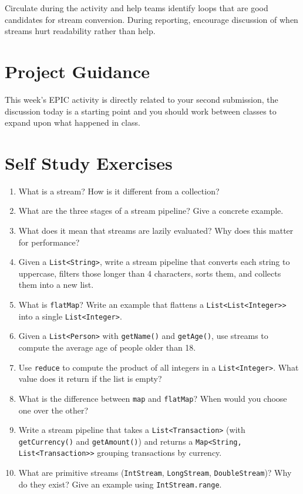 \documentclass[twoside=false,DIV=14]{scrartcl}
\begin{document}
\begin{teacher}
Circulate during the activity and help teams identify loops that are good candidates for stream conversion.  During reporting, encourage discussion of when streams hurt readability rather than help.
\end{teacher}

\section*{Project Guidance}

This week's EPIC activity is directly related to your second submission, the discussion today is a starting point and you  should work between classes to expand upon what happened in class.

\section*{Self Study Exercises}
\begin{enumerate}
\item What is a stream?  How is it different from a collection?

\item What are the three stages of a stream pipeline?  Give a concrete example.

\item What does it mean that streams are lazily evaluated?  Why does this matter for performance?

\item Given a \texttt{List<String>}, write a stream pipeline that converts each string to uppercase, filters those longer than 4 characters, sorts them, and collects them into a new list.

\item What is \texttt{flatMap}?  Write an example that flattens a \texttt{List<List<Integer>>} into a single \texttt{List<Integer>}.

\item Given a \texttt{List<Person>} with \texttt{getName()} and \texttt{getAge()}, use streams to compute the average age of people older than 18.

\item Use \texttt{reduce} to compute the product of all integers in a \texttt{List<Integer>}.  What value does it return if the list is empty?

\item What is the difference between \texttt{map} and \texttt{flatMap}?  When would you choose one over the other?

\item Write a stream pipeline that takes a \texttt{List<Transaction>} (with \texttt{getCurrency()} and \texttt{getAmount()}) and returns a \texttt{Map<String, List<Transaction>>} grouping transactions by currency.

\item What are primitive streams (\texttt{IntStream}, \texttt{LongStream}, \texttt{DoubleStream})?  Why do they exist?  Give an example using \texttt{IntStream.range}.
\end{enumerate}
\end{document}
